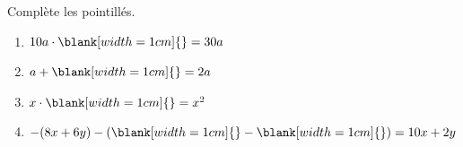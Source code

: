 %
%
    Complète les pointillés.
    \begin{enumerate}[cols=2]
        \item \(10a\cdot \blank[width=1cm]{} = 30a\)
        \item \(a + \blank[width=1cm]{} = 2a\)
        \item \(x \cdot \blank[width=1cm]{} = x^2\)
        \item \(-(8x+6y)- (\blank[width=1cm]{} - \blank[width=1cm]{} ) = 10x + 2y\)
    \end{enumerate}
